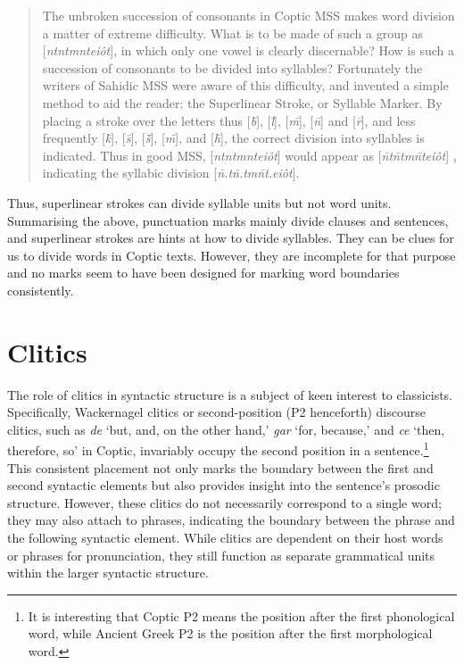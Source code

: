 \documentclass[output=paper,colorlinks,citecolor=brown ,chinesefont]{langscibook}
\begin{document}
\begin{quote} 
The unbroken succession of consonants in Coptic MSS makes word division a matter of extreme difficulty. What is to be made of such a group as  [\textit{ntntmnteiôt}], in which only one vowel is clearly discernable? How is such a succession of consonants to be divided into syllables? Fortunately the writers of Sahidic MSS were aware of this difficulty, and invented a simple method to aid the reader: the Superlinear Stroke, or Syllable Marker. By placing a stroke over the letters thus  [\textit{\={b}}],  [\textit{\={l}}],  [\textit{\={m}}],  [\textit{\={n}}] and  [\textit{\={r}}], and less frequently  [\textit{\={k}}],  [\textit{\={s}}],   [\textit{\={š}}],   [\textit{\={m}}], and  [\textit{\={h}}], the correct division into syllables is indicated. Thus in good MSS,   [\textit{ntntmnteiôt}] would appear as  [\textit{\={n}t\={n}tm\={n}teiôt}] , indicating the syllabic division  [\textit{\={n}.t\={n}.tm\={n}t.eiôt}].
\end{quote}


Thus, superlinear strokes can divide syllable units but not word units. Summarising the above, punctuation marks mainly divide clauses and sentences, and superlinear strokes are hints at how to divide syllables. They can be clues for us to divide words in Coptic texts. However, they are incomplete for that purpose and no marks seem to have been designed for marking word boundaries consistently.

\section{Clitics}

The role of clitics in syntactic structure is a subject of keen interest to classicists. Specifically, Wackernagel clitics or second-position (P2 henceforth) discourse clitics, such as  \textit{de} ‘but, and, on the other hand,'  \textit{gar} ‘for, because,' and  \textit{ce} ‘then, therefore, so' in Coptic, invariably occupy the second position in a sentence.\footnote{It is interesting that Coptic P2 means the position after the first phonological word, while Ancient Greek P2 is the position after the first morphological word.} This consistent placement not only marks the boundary between the first and second syntactic elements but also provides insight into the sentence's prosodic structure. However, these clitics do not necessarily correspond to a single word; they may also attach to phrases, indicating the boundary between the phrase and the following syntactic element. While clitics are dependent on their host words or phrases for pronunciation, they still function as separate grammatical units within the larger syntactic structure.
\end{document}
